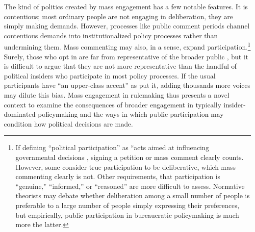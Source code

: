 The kind of politics created by mass engagement has a few notable features. It is contentious; most ordinary people are not engaging in deliberation, they are simply making demands. However, processes like public comment periods channel contentious demands into institutionalized policy processes rather than undermining them. Mass commenting may also, in a sense, expand participation.\footnote{
If defining ``political participation'' as ``acts aimed at influencing governmental decisions \citep[p. 2]{Verba1987}, signing a petition or mass comment clearly counts. However, some consider true participation to be deliberative, which mass commenting clearly is not. Other requirements, that participation is ``genuine,'' ``informed,'' or ``reasoned'' are more difficult to assess. %
Normative theorists may debate whether deliberation among a small number of people is preferable to a large number of people simply expressing their preferences, but empirically, public participation in bureaucratic policymaking is much more the latter.
} 
Surely, those who opt in are far from representative of the broader public \citep{Verba1987}, but it is difficult to argue that they are not more representative than the handful of political insiders who participate in most policy processes. If the usual participants have ``an upper-class accent'' as \citet{Schattschneider1942} put it, adding thousands more voices may dilute this bias. Mass engagement in rulemaking thus presents a novel context to examine the consequences of broader engagement in typically insider-dominated policymaking and the ways in which public participation may condition how political decisions are made. 





















